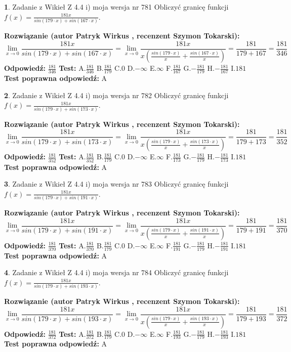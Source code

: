 \documentclass[12pt, a4paper]{article}
\theoremstyle{definition} %
\newtheorem{zad}{}
\newcommand{\zadStart}[1]{\begin{zad}#1\newline}
\newcommand{\zadStop}{\end{zad}}
\newcommand{\rozwStart}[2]{\noindent \textbf{Rozwiązanie (autor #1 , recenzent #2): }\newline}
\newcommand{\rozwStop}{\newline}
\newcommand{\odpStart}{\noindent \textbf{Odpowiedź:}\newline}
\newcommand{\odpStop}{\newline}
\newcommand{\testStart}{\noindent \textbf{Test:}\newline}
\newcommand{\testStop}{\newline}
\newcommand{\kluczStart}{\noindent \textbf{Test poprawna odpowiedź:}\newline}
\newcommand{\kluczStop}{\newline}
\begin{document}
\zadStart{Zadanie z Wikieł Z 4.4 i) moja wersja nr 781}
Obliczyć granicę funkcji $f(x)=\frac{181x}{sin(179\cdot x) +sin(167\cdot x)}$.
\zadStop
\rozwStart{Patryk Wirkus}{Szymon Tokarski}
$$\lim\limits_{x\to 0}\frac{181x}{sin(179\cdot x) +sin(167\cdot x)}=\lim\limits_{x\to 0}\frac{181x}{x(\frac{sin(179\cdot x)}{x}+\frac{sin(167\cdot x)}{x})}=\frac{181}{179+167} = \frac{181}{346}$$
\rozwStop
\odpStart
$\frac{181}{346}$
\odpStop
\testStart
A.$\frac{181}{346}$
B.$\frac{181}{179}$
C.$0$
D.$-\infty$
E.$\infty$
F.$\frac{181}{167}$
G.$-\frac{181}{179}$
H.$-\frac{181}{167}$
I.$181$
\testStop
\kluczStart
A
\kluczStop



\zadStart{Zadanie z Wikieł Z 4.4 i) moja wersja nr 782}
Obliczyć granicę funkcji $f(x)=\frac{181x}{sin(179\cdot x) +sin(173\cdot x)}$.
\zadStop
\rozwStart{Patryk Wirkus}{Szymon Tokarski}
$$\lim\limits_{x\to 0}\frac{181x}{sin(179\cdot x) +sin(173\cdot x)}=\lim\limits_{x\to 0}\frac{181x}{x(\frac{sin(179\cdot x)}{x}+\frac{sin(173\cdot x)}{x})}=\frac{181}{179+173} = \frac{181}{352}$$
\rozwStop
\odpStart
$\frac{181}{352}$
\odpStop
\testStart
A.$\frac{181}{352}$
B.$\frac{181}{179}$
C.$0$
D.$-\infty$
E.$\infty$
F.$\frac{181}{173}$
G.$-\frac{181}{179}$
H.$-\frac{181}{173}$
I.$181$
\testStop
\kluczStart
A
\kluczStop



\zadStart{Zadanie z Wikieł Z 4.4 i) moja wersja nr 783}
Obliczyć granicę funkcji $f(x)=\frac{181x}{sin(179\cdot x) +sin(191\cdot x)}$.
\zadStop
\rozwStart{Patryk Wirkus}{Szymon Tokarski}
$$\lim\limits_{x\to 0}\frac{181x}{sin(179\cdot x) +sin(191\cdot x)}=\lim\limits_{x\to 0}\frac{181x}{x(\frac{sin(179\cdot x)}{x}+\frac{sin(191\cdot x)}{x})}=\frac{181}{179+191} = \frac{181}{370}$$
\rozwStop
\odpStart
$\frac{181}{370}$
\odpStop
\testStart
A.$\frac{181}{370}$
B.$\frac{181}{179}$
C.$0$
D.$-\infty$
E.$\infty$
F.$\frac{181}{191}$
G.$-\frac{181}{179}$
H.$-\frac{181}{191}$
I.$181$
\testStop
\kluczStart
A
\kluczStop



\zadStart{Zadanie z Wikieł Z 4.4 i) moja wersja nr 784}
Obliczyć granicę funkcji $f(x)=\frac{181x}{sin(179\cdot x) +sin(193\cdot x)}$.
\zadStop
\rozwStart{Patryk Wirkus}{Szymon Tokarski}
$$\lim\limits_{x\to 0}\frac{181x}{sin(179\cdot x) +sin(193\cdot x)}=\lim\limits_{x\to 0}\frac{181x}{x(\frac{sin(179\cdot x)}{x}+\frac{sin(193\cdot x)}{x})}=\frac{181}{179+193} = \frac{181}{372}$$
\rozwStop
\odpStart
$\frac{181}{372}$
\odpStop
\testStart
A.$\frac{181}{372}$
B.$\frac{181}{179}$
C.$0$
D.$-\infty$
E.$\infty$
F.$\frac{181}{193}$
G.$-\frac{181}{179}$
H.$-\frac{181}{193}$
I.$181$
\testStop
\kluczStart
A
\kluczStop
\end{document}

